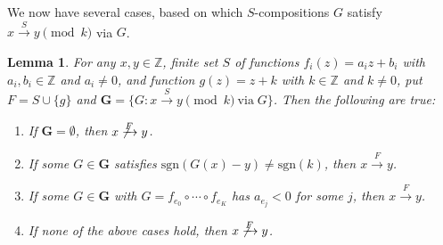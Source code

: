 \documentclass[11pt]{amsart}
\newcommand{\Z}{\mathbb{Z}}
\newcommand{\sgn}[1]{\mathrm{sgn}(#1)}
\newcommand{\tab}{\;\;\;\;\;}
\newtheorem{lemma}{Lemma}
\theoremstyle{definition}
\theoremstyle{remark}
\begin{document}
We now have several cases, based on which $S$-compositions $G$ satisfy $x \xrightarrow{S} y \pmod k$ via $G$.
\begin{lemma} \label{lemma-cases}
For any $x,y \in \Z$, finite set $S$ of functions $f_i(z) = a_i z + b_i$ with $a_i, b_i \in \Z$ and $a_i \ne 0$, and function $g(z) = z + k$ with $k \in \Z$ and $k \ne 0$, put $F = S \cup \{g\}$ and $\mathbf{G} = \{ G : x \xrightarrow{S} y \pmod k \: \text{via} \; G \}$. Then the following are true:
\begin{enumerate}[\tab (A)]
\item If $\mathbf{G} = \emptyset$, then $x \not \xrightarrow{F} y$. \label{case-none}
\item If some $G \in \mathbf{G}$ satisfies $\sgn{G(x) - y} \ne \sgn{k}$, then $x \xrightarrow{F} y$. \label{case-opposite-sign}
\item If some $G \in \mathbf{G}$ with $G = f_{e_0} \circ \cdots \circ f_{e_K}$ has $a_{e_j} < 0$ for some $j$, then $x \xrightarrow{F} y$. \label{case-negative-coeff}
\item If none of the above cases hold, then $x \not \xrightarrow{F} y$. \label{case-same-sign}
\end{enumerate}
\end{lemma}
\end{document}

